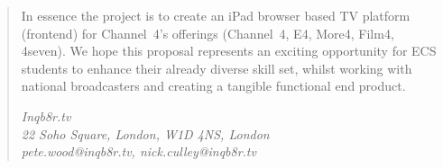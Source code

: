 \begin{quotation}
In essence the project is to create an iPad browser based TV platform (frontend) for Channel~4's offerings (Channel~4, E4, More4, Film4, 4seven). We hope this proposal represents an exciting opportunity for ECS students to enhance their already diverse skill set, whilst working with national broadcasters and creating a tangible functional end product.

\begin{centering}
	\textit{Inqb8r.tv}\\
	\textit{22 Soho Square, London, W1D 4NS, London}\\
	\textit{pete.wood@inqb8r.tv, nick.culley@inqb8r.tv}\\
\end{centering}
\end{quotation}